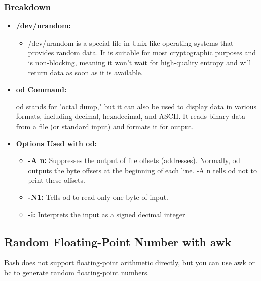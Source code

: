 \documentclass{report}
\begin{document}
    \subsubsection{Breakdown}
    \begin{itemize}
        \item \textbf{/dev/urandom:}
            \begin{itemize}
                \item /dev/urandom is a special file in Unix-like operating systems that provides random data. It is suitable for most cryptographic purposes and is non-blocking, meaning it won't wait for high-quality entropy and will return data as soon as it is available.
            \end{itemize}
        \item \textbf{od Command:}
            \begin{itemize}
                od stands for "octal dump," but it can also be used to display data in various formats, including decimal, hexadecimal, and ASCII.
                It reads binary data from a file (or standard input) and formats it for output.
        \end{itemize}
        \item \textbf{Options Used with od:}
            \begin{itemize}
                \item \textbf{-A n:} Suppresses the output of file offsets (addresses). Normally, od outputs the byte offsets at the beginning of each line. -A n tells od not to print these offsets.
                \item \textbf{-N1:} Tells od to read only one byte of input.
                \item \textbf{-i:} Interprets the input as a signed decimal integer
            \end{itemize}
    \end{itemize}

    \bigbreak \noindent 
    \subsection{Random Floating-Point Number with awk}
    \bigbreak \noindent 
    Bash does not support floating-point arithmetic directly, but you can use awk or bc to generate random floating-point numbers.
    \bigbreak \noindent 
\end{document}
